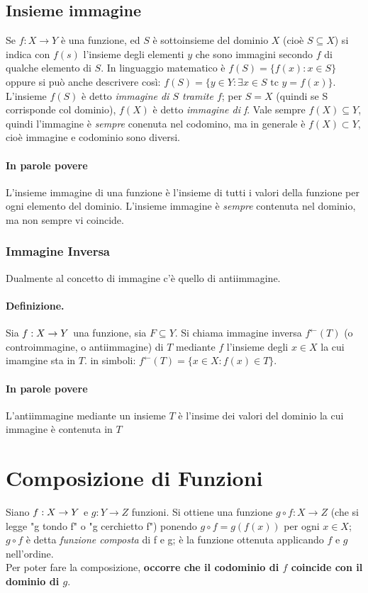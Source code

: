 \documentclass[12pt, a4paper, openany]{book}
\begin{document}
\subsection*{Insieme immagine}
Se $f: X \rightarrow Y$ è una funzione, ed $S$ è sottoinsieme del dominio $X$ (cioè $S \subseteq X$) si indica con $f(s)$ l'insieme degli elementi $y$ che sono immagini secondo $f$ di qualche elemento di $S$.
In linguaggio matematico è $f(S) = \{ f(x) : x \in S\}$ oppure si può anche descrivere così: $f(S) = \{y \in Y : \exists x \in S \text{ tc } y = f(x)\}$.
L'insieme $f(S)$ è detto \emph{immagine di $S$ tramite $f$}; per $S = X$ (quindi se S corrisponde col dominio), $f(X)$ è detto \emph{immagine di f}.
Vale sempre $f(X) \subseteq Y$, quindi l'immagine è \emph{sempre} conenuta nel codomino, ma in generale è $f(X) \subset Y$, cioè immagine e codominio sono diversi.
\paragraph{In parole povere} L'insieme immagine di una funzione è l'insieme di tutti i valori della funzione per ogni elemento del dominio.
L'insieme immagine è \emph{sempre} contenuta nel dominio, ma non sempre vi coincide.

\subsubsection{Immagine Inversa}
Dualmente al concetto di immagine c'è quello di antiimmagine.
\paragraph{Definizione. }Sia $f: X \rightarrow Y $ una funzione, sia $F \subseteq Y$.
Si chiama immagine inversa $f^\leftarrow(T)$ (o controimmagine, o antiimmagine) di $T$ mediante $f$ l'insieme degli $x \in X$ la cui imamgine sta in $T$.
in simboli: $f^\leftarrow(T) = \{ x \in X : f(x) \in T\}$.
\paragraph{In parole povere} L'antiimmagine mediante un insieme $T$ è l'insime dei valori del dominio la cui immagine è contenuta in $T$


\section{Composizione di Funzioni}
Siano $f: X \rightarrow Y$ e $g: Y \rightarrow Z$ funzioni.
Si ottiene una funzione $g \circ f : X \rightarrow Z $ (che si legge "g tondo f" o "g cerchietto f") ponendo $g \circ f = g(f(x))$ per ogni $x \in X$;
$g \circ f$ è detta \emph{funzione composta} di f e g; è la funzione ottenuta applicando $f$ e $g$ nell'ordine.
\\Per poter fare la composizione, \textbf{occorre che il codominio di $f$ coincide con il dominio di $g$}.
\end{document}
